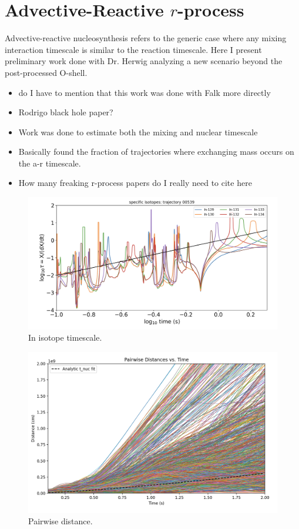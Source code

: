 \section{Advective-Reactive \texorpdfstring{$r$}{r}-process}\label{sec:ar_rprocess}

Advective-reactive nucleosynthesis refers to the generic case where any mixing interaction timescale is similar to the reaction timescale.
Here I present preliminary work done with Dr. Herwig analyzing a new scenario beyond the post-processed O-shell.

\begin{itemize}
    \item do I have to mention that this work was done with Falk more directly
    \item Rodrigo black hole paper?
    \item Work was done to estimate both the mixing and nuclear timescale
    \item Basically found the fraction of trajectories where exchanging mass occurs on the a-r timescale.
    \item How many freaking r-process papers do I really need to cite here
\end{itemize}

\begin{figure}
\label{fig:in_timescale}
\includegraphics[width=\textwidth]{chapters/3/figures/in_timescale.png}
\caption{In isotope timescale.}
\end{figure}

\begin{figure}
\label{fig:pairwise}
\includegraphics[width=\textwidth]{chapters/3/figures/pairwise.png}
\caption{Pairwise distance.}
\end{figure}

